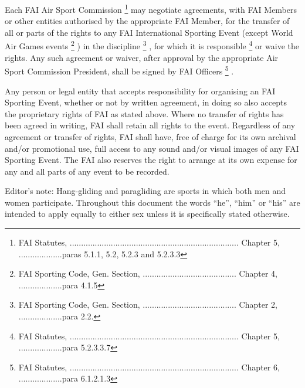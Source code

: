 Each FAI Air Sport Commission
\footnote{FAI Statutes, .......................................................................... Chapter 5, ...................paras 5.1.1, 5.2, 5.2.3 and 5.2.3.3}
may negotiate agreements, with FAI Members or other entities authorised by the
appropriate FAI Member, for the transfer of all or parts of the rights to any
FAI International Sporting Event (except World Air Games events
\footnote{FAI Sporting Code, Gen. Section, ......................................... Chapter 4, ...................para 4.1.5}
) in the discipline
\footnote{FAI Sporting Code, Gen. Section, ......................................... Chapter 2, ...................para 2.2.}
, for which it is responsible
\footnote{FAI Statutes, .......................................................................... Chapter 5, ...................para 5.2.3.3.7}
or waive the rights. Any such agreement or waiver, after approval by the
appropriate Air Sport Commission President, shall be signed by FAI Officers
\footnote{FAI Statutes, .......................................................................... Chapter 6, ...................para 6.1.2.1.3}
.

Any person or legal entity that accepts responsibility for organising an FAI
Sporting Event, whether or not by written agreement, in doing so also accepts
the proprietary rights of FAI as stated above. Where no transfer of rights has
been agreed in writing, FAI shall retain all rights to the event. Regardless of
any agreement or transfer of rights, FAI shall have, free of charge for its own
archival and/or promotional use, full access to any sound and/or visual images
of any FAI Sporting Event. The FAI also reserves the right to arrange at its
own expense for any and all parts of any event to be recorded.

Editor’s note: Hang-gliding and paragliding are sports in which both men and
women participate. Throughout this document the words “he”, “him” or “his” are
intended to apply equally to either sex unless it is specifically stated
otherwise.
